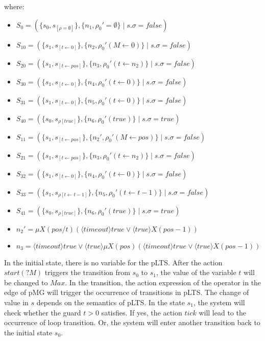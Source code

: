 \documentclass[runningheads,a4paper]{llncs}
\begin{document}
where:
\begin{itemize}
	\item $S_{0}  = (\{s_{0},s_{[\rho=\emptyset]}\}, \{n_{1}, \rho_{0}'=\emptyset\}\;|\;s.\sigma = false)$
	\item $S_{10} = (\{s_{1},s_{[t\leftarrow 0]}\}, \{n_{2}, \rho_{0}'(M\leftarrow 0)\}\;|\;s.\sigma = false)$
	\item $S_{20} = (\{s_{1},s_{[t\leftarrow pos]}\}, \{n_{3}, \rho_{0}'(t\leftarrow n_{2})\}\;|\;s.\sigma = false)$
	\item $S_{30} = (\{s_{1},s_{[t\leftarrow 0]}\}, \{n_{4}, \rho_{0}'(t\leftarrow 0)\}\;|\;s.\sigma = false)$
	\item $S_{31} = (\{s_{1},s_{[t\leftarrow 0]}\}, \{n_{5}, \rho_{0}'(t\leftarrow 0)\}\;|\;s.\sigma = false)$
	\item $S_{40} = (\{s_{0},s_{\rho[true]}\}, \{n_{6}, \rho_{0}'(true)\}\;|\;s.\sigma = true)$
	
	\item $S_{11} = (\{s_{1},s_{[t\leftarrow pos]}\}, \{n_{2}', \rho_{0}'(M\leftarrow pos)\}\;|\;s.\sigma = false)$
	\item $S_{21} = (\{s_{1},s_{[t\leftarrow pos]}\}, \{n_{3}, \rho_{0}'(t\leftarrow n_{2})\}\;|\;s.\sigma = false)$
	\item $S_{32} = (\{s_{1},s_{[t\leftarrow 0]}\}, \{n_{4}, \rho_{0}'(t\leftarrow 0)\}\;|\;s.\sigma = false)$
	\item $S_{33} = (\{s_{1},s_{\rho[t\leftarrow t-1]}\}, \{n_{5}, \rho_{0}'(t\leftarrow t-1)\}\;|\;s.\sigma = false)$
	\item $S_{41} = (\{s_{0},s_{\rho[true]}\}, \{n_{6}, \rho_{0}'(true)\}\;|\;s.\sigma = true)$
	\item $n_{2}'=\mu X(pos/t)(\langle timeout\rangle true \vee \langle true\rangle X(pos-1))$
	\item $n_{3}=\langle timeout\rangle true \vee\langle true\rangle\mu X(pos)(\langle timeout\rangle true \vee \langle true\rangle X(pos-1))$
\end{itemize}

In the initial state, there is no variable for the pLTS. After the action $start(?M)$ triggers the transition from $s_{0}$ to $s_{1}$, the value of the variable $t$ will be changed to $Max$. In the transition, the action expression of the operator in the edge of pMG will trigger the occurrence of transitions in pLTS. The change of value in $s$ depends on the semantics of pLTS. In the state $s_{1}$, the system will check whether the guard $t>0$ satisfies. If yes, the action $tick$ will lead to the occurrence of loop transition. Or, the system will enter another transition back to the initial state $s_{0}$. {\color{red}{[After executing the model checking graph, it will finally return to state $S_{40}$ or state $S_{41}$. Both of them are true.}}
\end{document}
